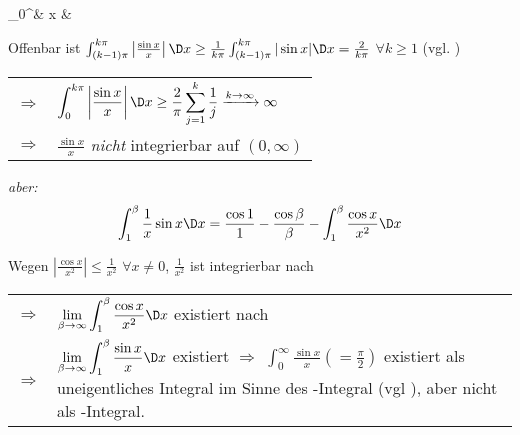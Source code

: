 \begin{example}
	{\zeroAmsmathAlignVSpaces\begin{flalign*}
	\int_0^\infty & \D x &
	\end{flalign*}}
	
	Offenbar ist $\int_{(k - 1)\pi}^{k\pi} \left\vert \frac{\sin x}{x} \right\vert \D x \ge \frac{1}{k\pi} \int_{(k - 1)\pi}^{k\pi} \vert \sin x \vert \D x = \frac{2}{k\pi}$ $\forall k\ge 1$ (vgl. ) \\
	\begin{tabularx}{\linewidth}{r@{\ \ }X}
	$\Rightarrow$ & $\displaystyle\int_0^{k\pi} \left\vert \frac{\sin x}{x}\right\vert \D x \ge \frac{2}{\pi} \sum_{j=1}^k \frac{1}{j} \xrightarrow{k\to\infty} \infty$ \\
	$\Rightarrow$ & $\frac{\sin x}{x}$ \emph{nicht} integrierbar auf $(0,\infty)$
	\end{tabularx}
	
	\emph{aber:}\begin{align*}\int_1^\beta \frac{1}{x} \sin x \D x = \frac{\cos 1}{1} - \frac{\cos \beta}{\beta} - \int_1^\beta \frac{\cos x}{x^2} \D x
	\end{align*}
	
	Wegen $\left\vert\frac{\cos x}{x^2}\right\vert\le\frac{1}{x^2}$ $\forall x\neq 0$, $\frac{1}{x^2}$ ist integrierbar nach  \\
	\begin{tabularx}{\linewidth}{r@{\ \ }X}
	$\Rightarrow$ & $\displaystyle\lim\limits_{\beta\to\infty} \int_1^\beta \frac{\cos x}{x^2} \D x$ existiert nach \propref{integral_funktion_majorantenkriterium} \\
	$\Rightarrow$ & $\displaystyle \lim\limits_{\beta\to\infty} \int_1^\beta \frac{\sin x}{x}\D x$ existiert $\Rightarrow$ $\int_0^\infty \frac{\sin x}{x} \left( = \frac{\pi}{2}\right)$ existiert als uneigentliches Integral im Sinne des \person{Riemann}-Integral (vgl \propref{integral_r_uneigentlich_bemerkung}), aber nicht als \lebesque-Integral.
	\end{tabularx}
\end{example}